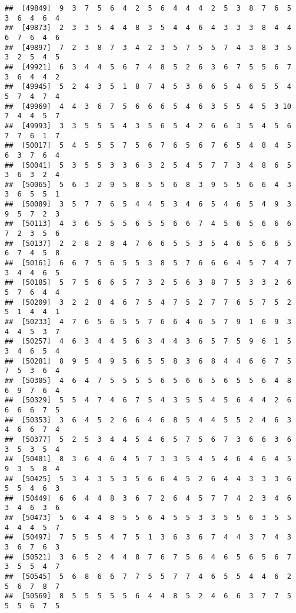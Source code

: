 \documentclass[
]{book}
\begin{document}
\begin{verbatim}
##  [49849]  9  3  7  5  6  4  2  5  6  4  4  4  2  5  3  8  7  6  5  3  6  4  6  4
##  [49873]  2  3  3  5  4  4  8  3  5  4  4  6  4  3  3  3  8  4  4  6  7  6  4  6
##  [49897]  7  2  3  8  7  3  4  2  3  5  7  5  5  7  4  3  8  3  5  3  2  5  4  5
##  [49921]  6  3  4  4  5  6  7  4  8  5  2  6  3  6  7  5  5  6  7  3  6  4  4  2
##  [49945]  5  2  4  3  5  1  8  7  4  5  3  6  6  5  4  6  5  5  4  5  7  4  7  4
##  [49969]  4  4  3  6  7  5  6  6  6  5  4  6  3  5  5  4  5  3 10  7  4  4  5  7
##  [49993]  3  3  5  5  5  4  3  5  6  5  4  2  6  6  3  5  4  5  6  7  7  6  1  7
##  [50017]  5  4  5  5  5  7  5  6  7  6  5  6  7  6  5  4  8  4  5  6  3  7  6  4
##  [50041]  5  3  5  5  3  3  6  3  2  5  4  5  7  7  3  4  8  6  5  3  6  3  2  4
##  [50065]  5  6  3  2  9  5  8  5  5  6  8  3  9  5  5  6  6  4  3  3  6  5  5  1
##  [50089]  3  5  7  7  6  5  4  4  5  3  4  6  5  4  6  5  4  9  3  9  5  7  2  3
##  [50113]  4  3  6  5  5  5  6  5  5  6  6  7  4  5  6  5  6  6  6  7  2  3  5  6
##  [50137]  2  2  8  2  8  4  7  6  6  5  5  3  5  4  6  5  6  6  5  6  7  4  5  8
##  [50161]  6  6  7  5  6  5  5  3  8  5  7  6  6  6  4  5  7  4  7  3  4  4  6  5
##  [50185]  5  7  5  6  6  5  7  3  2  5  6  3  8  7  5  3  3  2  6  5  7  6  4  4
##  [50209]  3  2  2  8  4  6  7  5  4  7  5  2  7  7  6  5  7  5  2  5  1  4  4  1
##  [50233]  4  7  6  5  6  5  5  7  6  6  4  6  5  7  9  1  6  9  3  4  4  5  3  7
##  [50257]  4  6  3  4  4  5  6  3  4  4  3  6  5  7  5  9  6  1  5  3  4  6  5  4
##  [50281]  8  9  5  4  9  5  6  5  5  8  3  6  8  4  4  6  6  7  5  7  5  3  6  4
##  [50305]  4  6  4  7  5  5  5  5  6  5  6  6  5  6  5  5  6  4  8  6  9  7  6  4
##  [50329]  5  5  4  7  4  6  7  5  4  3  5  5  4  5  6  4  4  2  6  6  6  6  7  5
##  [50353]  3  6  4  5  2  6  6  4  6  8  5  4  4  5  5  2  4  6  3  4  6  6  7  4
##  [50377]  5  2  5  3  4  4  5  4  6  5  7  5  6  7  3  6  6  3  6  3  5  3  5  4
##  [50401]  8  3  6  4  6  4  5  7  3  3  5  4  5  4  6  4  6  4  5  9  3  5  8  4
##  [50425]  5  3  4  3  5  3  5  6  6  4  5  2  6  4  4  3  3  3  6  5  5  4  6  3
##  [50449]  6  6  4  4  8  3  6  7  2  6  4  5  7  7  4  2  3  4  6  3  4  6  3  6
##  [50473]  5  6  4  4  8  5  5  6  4  5  5  3  3  5  5  6  3  5  5  4  4  4  5  7
##  [50497]  7  5  5  5  4  7  5  1  3  6  3  6  7  4  4  3  7  4  3  3  6  7  6  3
##  [50521]  3  6  5  2  4  4  8  7  6  7  5  6  4  6  5  6  5  6  7  3  5  5  4  7
##  [50545]  5  6  8  6  6  7  7  5  5  7  7  4  6  5  5  4  4  6  2  5  6  7  8  7
##  [50569]  8  5  5  5  5  5  6  4  4  8  5  2  4  6  6  3  7  7  5  5  5  6  7  5

\end{verbatim}
\end{document}
